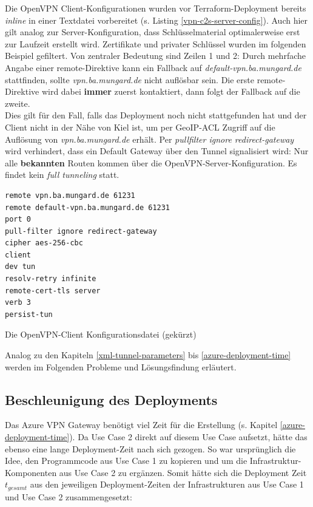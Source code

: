Die OpenVPN \gls{Client}-Konfigurationen wurden vor Terraform-\gls{Deployment} bereits \textit{inline} in einer Textdatei vorbereitet (s. Listing \ref{vpn-c2s-server-config}). Auch hier gilt analog zur Server-Konfiguration, dass Schlüsselmaterial optimalerweise erst zur Laufzeit erstellt wird. Zertifikate und privater Schlüssel wurden im folgenden Beispiel gefiltert. Von zentraler Bedeutung sind Zeilen 1 und 2: Durch mehrfache Angabe einer remote-Direktive kann ein \gls{Fallback} auf \textit{default-vpn.ba.mungard.de} stattfinden, sollte \textit{vpn.ba.mungard.de} nicht auflösbar sein. Die erste remote-Direktive wird dabei \textbf{immer} zuerst kontaktiert, dann folgt der \gls{Fallback} auf die zweite.\\
Dies gilt für den Fall, falls das \gls{Deployment} noch nicht stattgefunden hat und der \gls{Client} nicht in der Nähe von Kiel ist, um per \gls{GeoIP}-\gls{ACL} Zugriff auf die Auflösung von \textit{vpn.ba.mungard.de} erhält. Per \textit{pullfilter ignore redirect-gateway} wird verhindert, dass ein Default Gateway über den Tunnel signalisiert wird: Nur alle \textbf{bekannten} Routen kommen über die OpenVPN-Server-Konfiguration. Es findet kein \textit{full tunneling} statt.
\begin{listing}[h]
\begin{verbatim}
remote vpn.ba.mungard.de 61231
remote default-vpn.ba.mungard.de 61231
port 0
pull-filter ignore redirect-gateway
cipher aes-256-cbc
client
dev tun
resolv-retry infinite
remote-cert-tls server
verb 3
persist-tun

\end{verbatim}
\caption{Die OpenVPN-Client Konfigurationsdatei (gekürzt)}
\label{ovpn-client-conf}
\end{listing}\FloatBarrier



\newpage
Analog zu den Kapiteln \ref{xml-tunnel-parameters} bis \ref{azure-deployment-time} werden im Folgenden Probleme und Lösungsfindung erläutert.
\subsection{Beschleunigung des Deployments}\label{accelerate-deployment-use-case-2}
Das Azure \gls{VPN} Gateway benötigt viel Zeit für die Erstellung (s. Kapitel \ref{azure-deployment-time}). Da Use Case 2 direkt auf diesem Use Case aufsetzt, hätte das ebenso eine lange \gls{Deployment}-Zeit nach sich gezogen. So war ursprünglich die Idee, den Programmcode aus Use Case 1 zu kopieren und um die Infrastruktur-Komponenten aus Use Case 2 zu ergänzen. Somit hätte sich die \gls{Deployment} Zeit $t_{gesamt}$ aus den jeweiligen \gls{Deployment}-Zeiten der Infrastrukturen aus Use Case 1 und Use Case 2 zusammengesetzt:\\

